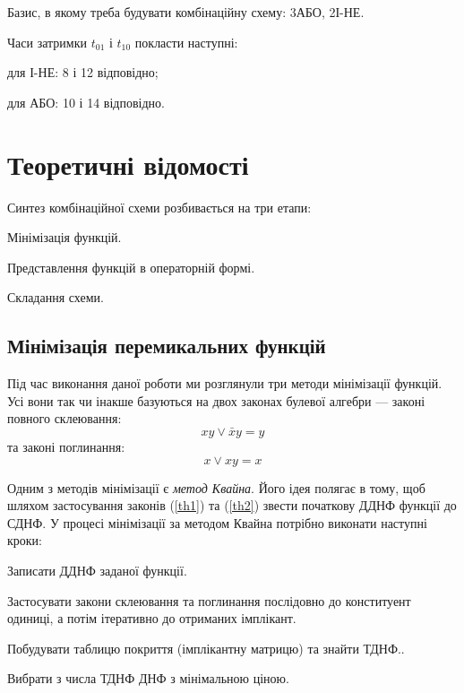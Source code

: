 \documentclass{labs}
\begin{document}
  Базис, в якому треба будувати комбінаційну схему: 3АБО, 2І-НЕ.

  Часи затримки $t_{01}$ і $t_{10}$ покласти наступні:
  \begin{itemizer}
    \item для І-НЕ: 8 і 12 відповідно;
    \item для АБО: 10 і 14 відповідно.
  \end{itemizer}

\newpage
\chapter{Теоретичні відомості}
  Синтез комбінаційної схеми розбивається на три етапи:
  \begin{enumerator}
    \item Мінімізація функцій.
    \item Представлення функцій в операторній формі.
    \item Складання схеми.
  \end{enumerator}

  \section{Мінімізація перемикальних функцій}
    Під час виконання даної роботи ми розглянули три методи мінімізації
    функцій.
    Усі вони так чи інакше базуються на двох законах булевої алгебри --- законі
    повного склеювання:
    \begin{equation}
      xy\lor\bar{x}y = y
      \label{th1}
    \end{equation}
    та законі поглинання:
    \begin{equation}
      x \lor xy = x
      \label{th2}
    \end{equation}

    Одним з методів мінімізації є \textit{метод Квайна}.
    Його ідея полягає в тому, щоб шляхом застосування законів (\ref{th1}) та
    (\ref{th2}) звести початкову ДДНФ функції до СДНФ.
    У процесі мінімізації за методом Квайна потрібно виконати наступні кроки:
    \begin{enumerator} 
      \item Записати ДДНФ заданої функції.
      \item Застосувати закони склеювання та поглинання послідовно до
        конституент одиниці, а потім ітеративно до отриманих імплікант.
      \item Побудувати таблицю покриття (імплікантну матрицю) та знайти ТДНФ..
      \item Вибрати з числа ТДНФ ДНФ з мінімальною ціною.
    \end{enumerator}
\end{document}
